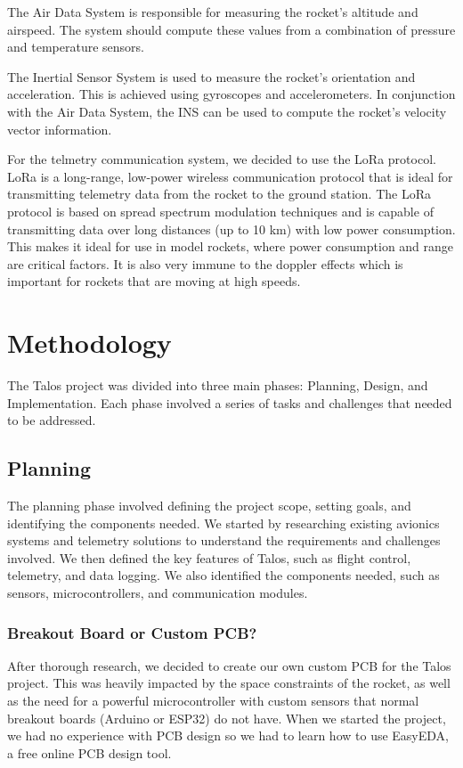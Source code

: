 \documentclass{article}
\begin{document}
The Air Data System is responsible for measuring the rocket's altitude and airspeed. The system should compute these values from a combination of pressure and temperature sensors.

The Inertial Sensor System is used to measure the rocket's orientation and acceleration. This is achieved using gyroscopes and accelerometers. In conjunction with the Air Data System, the INS can be used to compute the rocket's velocity vector information.

For the telmetry communication system, we decided to use the LoRa protocol. LoRa is a long-range, low-power wireless communication protocol that is ideal for transmitting telemetry data from the rocket to the ground station. The LoRa protocol is based on spread spectrum modulation techniques and is capable of transmitting data over long distances (up to 10 km) with low power consumption. This makes it ideal for use in model rockets, where power consumption and range are critical factors. It is also very immune to the doppler effects\cite{8723123} which is important for rockets that are moving at high speeds.

\section{Methodology}

The Talos project was divided into three main phases: Planning, Design, and Implementation. Each phase involved a series of tasks and challenges that needed to be addressed.

\subsection{Planning}

The planning phase involved defining the project scope, setting goals, and identifying the components needed. We started by researching existing avionics systems and telemetry solutions to understand the requirements and challenges involved. We then defined the key features of Talos, such as flight control, telemetry, and data logging. We also identified the components needed, such as sensors, microcontrollers, and communication modules.
\subsubsection{Breakout Board or Custom PCB?}
After thorough research, we decided to create our own custom PCB for the Talos project. This was heavily impacted by the space constraints of the rocket, as well as the need for a powerful microcontroller with custom sensors that normal breakout boards (Arduino or ESP32) do not have. When we started the project, we had no experience with PCB design so we had to learn how to use EasyEDA, a free online PCB design tool.
\end{document}
